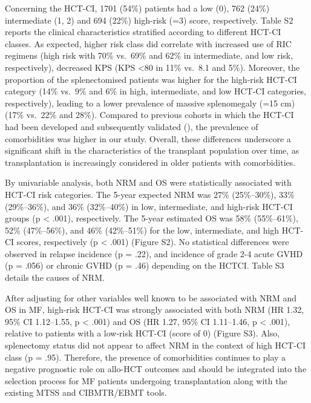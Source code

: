 \documentclass[
  letterpaper,
  DIV=11,
  numbers=noendperiod]{scrreprt}
\begin{document}
Concerning the HCT-CI, 1701 (54\%) patients had a low (0), 762 (24\%)
intermediate (1, 2) and 694 (22\%) high-risk (=3) score, respectively.
Table S2 reports the clinical characteristics stratified according to
different HCT-CI classes. As expected, higher risk class did correlate
with increased use of RIC regimens (high risk with 70\% vs.~69\% and
62\% in intermediate, and low risk, respectively), decreased KPS (KPS
\textless80 in 11\% vs.~8.1 and 5\%). Moreover, the proportion of the
splenectomised patients was higher for the high-risk HCT-CI category
(14\% vs.~9\% and 6\% in high, intermediate, and low HCT-CI categories,
respectively), leading to a lower prevalence of massive splenomegaly
(=15 cm) (17\% vs.~22\% and 28\%). Compared to previous cohorts in which
the HCT-CI had been developed and subsequently validated
(), the prevalence of comorbidities was higher in our
study. Overall, these differences underscore a significant shift in the
characteristics of the transplant population over time, as
transplantation is increasingly considered in older patients with
comorbidities.

By univariable analysis, both NRM and OS were statistically associated
with HCT-CI risk categories. The 5-year expected NRM was 27\%
(25\%--30\%), 33\% (29\%--36\%), and 36\% (32\%--40\%) in low,
intermediate, and high-risk HCT-CI groups (p \textless{} .001),
respectively. The 5-year estimated OS was 58\% (55\%--61\%), 52\%
(47\%--56\%), and 46\% (42\%--51\%) for the low, intermediate, and high
HCT-CI scores, respectively (p \textless{} .001) (Figure S2). No
statistical differences were observed in relapse incidence (p = .22),
and incidence of grade 2-4 acute GVHD (p = .056) or chronic GVHD (p =
.46) depending on the HCTCI. Table S3 details the causes of NRM.

After adjusting for other variables well known to be associated with NRM
and OS in MF, high-risk HCT-CI was strongly associated with both NRM (HR
1.32, 95\% CI 1.12--1.55, p \textless{} .001) and OS (HR 1.27, 95\% CI
1.11--1.46, p \textless{} .001), relative to patients with a low-risk
HCT-CI (score of 0) (Figure S3). Also, splenectomy status did not appear
to affect NRM in the context of high HCT-CI class (p = .95). Therefore,
the presence of comorbidities continues to play a negative prognostic
role on allo-HCT outcomes and should be integrated into the selection
process for MF patients undergoing transplantation along with the
existing MTSS and CIBMTR/EBMT tools.
\end{document}
